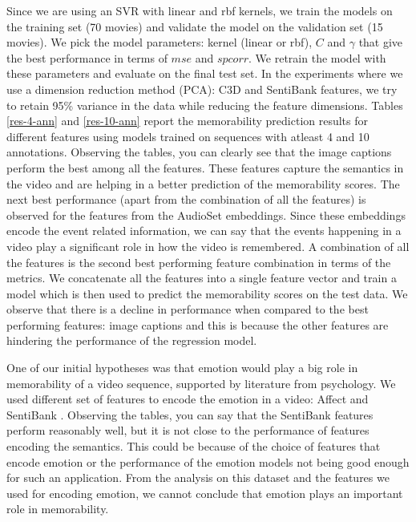 \documentclass[sigconf]{acmart}
\begin{document}
Since we are using an SVR with linear and rbf kernels, we train the models on the training set (70 movies) and validate the model on the validation set (15 movies).
We pick the model parameters: kernel (linear or rbf), $C$ and $\gamma$ that give the best performance in terms of $mse$ and $spcorr$.
We retrain the model with these parameters and evaluate on the final test set.
In the experiments where we use a dimension reduction method (PCA): C3D and SentiBank features, we try to retain 95\% variance in the data while reducing the feature dimensions.
Tables \ref{res-4-ann} and \ref{res-10-ann} report the memorability prediction results for different features using models trained on sequences with atleast 4 and 10 annotations.
Observing the tables, you can clearly see that the image captions perform the best among all the features.
These features capture the semantics in the video and are helping in a better prediction of the memorability scores.
The next best performance (apart from the combination of all the features) is observed for the features from the AudioSet embeddings.
Since these embeddings encode the event related information, we can say that the events happening in a video play a significant role in how the video is remembered.
A combination of all the features is the second best performing feature combination in terms of the metrics.
We concatenate all the features into a single feature vector and train a model which is then used to predict the memorability scores on the test data. 
We observe that there is a decline in performance when compared to the best performing features: image captions and this is because the other features are hindering the performance of the regression model.

One of our initial hypotheses was that emotion would play a big role in memorability of a video sequence, supported by literature from psychology.
We used different set of features to encode the emotion in a video: Affect \cite{affect} and SentiBank \cite{sb-feat}.
Observing the tables, you can say that the SentiBank features perform reasonably well, but it is not close to the performance of features encoding the semantics.
This could be because of the choice of features that encode emotion or the performance of the emotion models not being good enough for such an application.
From the analysis on this dataset and the features we used for encoding emotion, we cannot conclude that emotion plays an important role in memorability.
\end{document}
